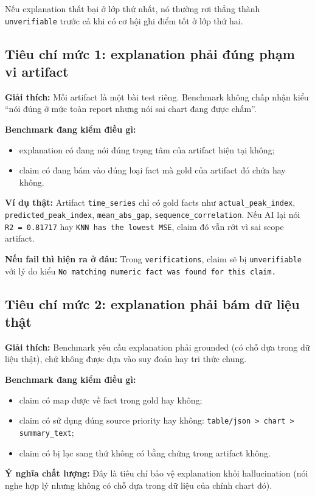 \documentclass[11pt,a4paper]{article}
\newcommand{\field}[1]{\texttt{#1}}
\begin{document}
Nếu explanation thất bại ở lớp thứ nhất, nó thường rơi thẳng thành \field{unverifiable} trước cả khi có cơ hội ghi điểm tốt ở lớp thứ hai.

\subsection{Tiêu chí mức 1: explanation phải đúng phạm vi artifact}
\textbf{Giải thích:}
Mỗi artifact là một bài test riêng.
Benchmark không chấp nhận kiểu ``nói đúng ở mức toàn report nhưng nói sai chart đang được chấm''.

\textbf{Benchmark đang kiểm điều gì:}
\begin{itemize}
  \item explanation có đang nói đúng trọng tâm của artifact hiện tại không;
  \item claim có đang bám vào đúng loại fact mà gold của artifact đó chứa hay không.
\end{itemize}

\textbf{Ví dụ thật:}
Artifact \field{time\_series} chỉ có gold facts như
\field{actual\_peak\_index}, \field{predicted\_peak\_index}, \field{mean\_abs\_gap}, \field{sequence\_correlation}.
Nếu AI lại nói \field{R2 = 0.81717} hay \field{KNN has the lowest MSE},
claim đó vẫn rớt vì sai scope artifact.

\textbf{Nếu fail thì hiện ra ở đâu:}
Trong \field{verifications}, claim sẽ bị \field{unverifiable} với lý do kiểu
\field{No matching numeric fact was found for this claim.}

\subsection{Tiêu chí mức 2: explanation phải bám dữ liệu thật}
\textbf{Giải thích:}
Benchmark yêu cầu explanation phải grounded (có chỗ dựa trong dữ liệu thật), chứ không được dựa vào suy đoán hay tri thức chung.

\textbf{Benchmark đang kiểm điều gì:}
\begin{itemize}
  \item claim có map được về fact trong gold hay không;
  \item claim có sử dụng đúng source priority hay không:
  \field{table/json > chart > summary\_text};
  \item claim có bị lạc sang thứ không có bằng chứng trong artifact không.
\end{itemize}

\textbf{Ý nghĩa chất lượng:}
Đây là tiêu chí bảo vệ explanation khỏi hallucination (nói nghe hợp lý nhưng không có chỗ dựa trong dữ liệu của chính chart đó).
\end{document}

